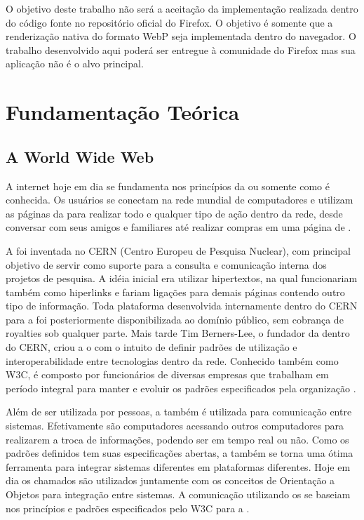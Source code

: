\documentclass[espaco=simples,appendix=Name]{abnt}
\begin{document}
\begin{description}
O objetivo deste trabalho não será a aceitação da implementação realizada dentro do código fonte no repositório oficial do Firefox. O objetivo é somente que a renderização nativa do formato WebP seja implementada dentro do navegador. O trabalho desenvolvido aqui poderá ser entregue à comunidade do Firefox mas sua aplicação não é o alvo principal.

\end{description}

\chapter{Fundamentação Teórica}

\begin{description}

\section{A World Wide Web}

\item \noindent
A internet hoje em dia se fundamenta nos princípios da  ou somente  como é conhecida. Os usuários se conectam na rede mundial de computadores e utilizam as páginas da  para realizar todo e qualquer tipo de ação dentro da rede, desde conversar com seus amigos e familiares até realizar compras em uma página de .

A  foi inventada no CERN (Centro Europeu de Pesquisa Nuclear), com principal objetivo de servir como suporte para a consulta e comunicação interna dos projetos de pesquisa\cite{WebStory}. A idéia inicial era utilizar hipertextos, na qual funcionariam também como hiperlinks e fariam ligações para demais páginas contendo outro tipo de informação. Toda plataforma desenvolvida internamente dentro do CERN para a  foi posteriormente disponibilizada ao domínio público, sem cobrança de royalties sob qualquer parte. Mais tarde Tim Berners-Lee, o fundador da  dentro do CERN, criou a o  com o intuito de definir padrões de utilização e interoperabilidade entre tecnologias dentro da rede. Conhecido também como W3C, é composto por funcionários de diversas empresas que trabalham em período integral para manter e evoluir os padrões especificados pela organização \cite{W3Cfacts}.

Além de ser utilizada por pessoas, a  também é utilizada para comunicação entre sistemas. Efetivamente são computadores acessando outros computadores para realizarem a troca de informações, podendo ser em tempo real ou não. Como os padrões definidos tem suas especificações abertas, a  também se torna uma ótima ferramenta para integrar sistemas diferentes em plataformas diferentes. Hoje em dia os chamados  são utilizados juntamente com os conceitos de Orientação a Objetos para integração entre sistemas. A comunicação utilizando os  se baseiam nos princípios e padrões especificados pelo W3C para a  \cite{WebServices}.


\end{description}
\end{document}
